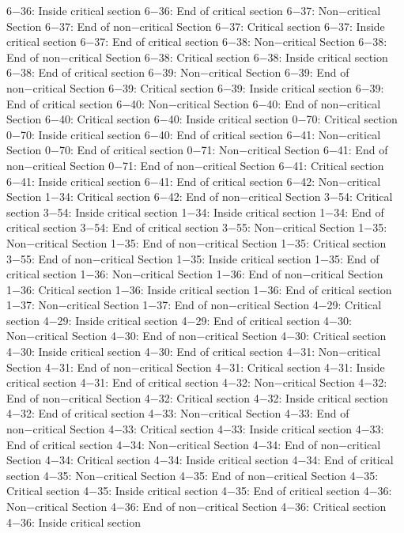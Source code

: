6−36: Inside critical section
6−36: End of critical section
6−37: Non−critical Section
6−37: End of non−critical Section
6−37: Critical section
6−37: Inside critical section
6−37: End of critical section
6−38: Non−critical Section
6−38: End of non−critical Section
6−38: Critical section
6−38: Inside critical section
6−38: End of critical section
6−39: Non−critical Section
6−39: End of non−critical Section
6−39: Critical section
6−39: Inside critical section
6−39: End of critical section
6−40: Non−critical Section
6−40: End of non−critical Section
6−40: Critical section
6−40: Inside critical section
0−70: Critical section
0−70: Inside critical section
6−40: End of critical section
6−41: Non−critical Section
0−70: End of critical section
0−71: Non−critical Section
6−41: End of non−critical Section
0−71: End of non−critical Section
6−41: Critical section
6−41: Inside critical section
6−41: End of critical section
6−42: Non−critical Section
1−34: Critical section
6−42: End of non−critical Section
3−54: Critical section
3−54: Inside critical section
1−34: Inside critical section
1−34: End of critical section
3−54: End of critical section
3−55: Non−critical Section
1−35: Non−critical Section
1−35: End of non−critical Section
1−35: Critical section
3−55: End of non−critical Section
1−35: Inside critical section
1−35: End of critical section
1−36: Non−critical Section
1−36: End of non−critical Section
1−36: Critical section
1−36: Inside critical section
1−36: End of critical section
1−37: Non−critical Section
1−37: End of non−critical Section
4−29: Critical section
4−29: Inside critical section
4−29: End of critical section
4−30: Non−critical Section
4−30: End of non−critical Section
4−30: Critical section
4−30: Inside critical section
4−30: End of critical section
4−31: Non−critical Section
4−31: End of non−critical Section
4−31: Critical section
4−31: Inside critical section
4−31: End of critical section
4−32: Non−critical Section
4−32: End of non−critical Section
4−32: Critical section
4−32: Inside critical section
4−32: End of critical section
4−33: Non−critical Section
4−33: End of non−critical Section
4−33: Critical section
4−33: Inside critical section
4−33: End of critical section
4−34: Non−critical Section
4−34: End of non−critical Section
4−34: Critical section
4−34: Inside critical section
4−34: End of critical section
4−35: Non−critical Section
4−35: End of non−critical Section
4−35: Critical section
4−35: Inside critical section
4−35: End of critical section
4−36: Non−critical Section
4−36: End of non−critical Section
4−36: Critical section
4−36: Inside critical section
